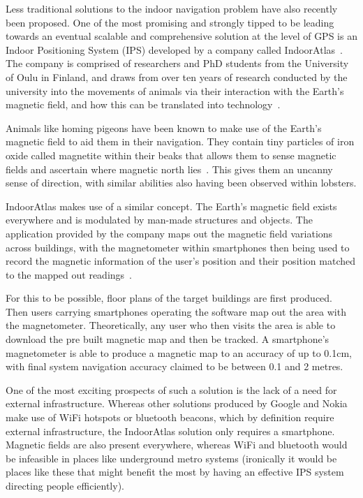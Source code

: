 \documentclass[12pt,a4paper]{report}
\begin{document}
Less traditional solutions to the indoor navigation problem have also recently been proposed. One of the most promising and strongly tipped to be leading towards an eventual scalable and comprehensive solution at the level of GPS is an Indoor Positioning System (IPS) developed by a company called IndoorAtlas~\cite{indoorAtlas}. The company is comprised of researchers and PhD students from the University of Oulu in Finland, and draws from over ten years of research conducted by the university into the movements of animals via their interaction with the Earth's magnetic field, and how this can be translated into technology~\cite{IAReport}.
 
Animals like homing pigeons have been known to make use of the Earth's magnetic field to aid them in their navigation. They contain tiny particles of iron oxide called magnetite within their beaks that allows them to sense magnetic fields and ascertain where magnetic north lies~\cite{pigeon}. This gives them an uncanny sense of direction, with similar abilities also having been observed within lobsters. 
 
IndoorAtlas makes use of a similar concept. The Earth's magnetic field exists everywhere and is modulated by man-made structures and objects. The application provided by the company maps out the magnetic field variations across buildings, with the magnetometer within smartphones then being used to record the magnetic information of the user's position and their position matched to the mapped out readings~\cite{IAReport}.
 
For this to be possible, floor plans of the target buildings are first produced. Then users carrying smartphones operating the software map out the area with the magnetometer. Theoretically, any user who then visits the area is able to download the pre built magnetic map and then be tracked. A smartphone's magnetometer is able to produce a magnetic map to an accuracy of up to 0.1cm, with final system navigation accuracy claimed to be between 0.1 and 2 metres. 
 
One of the most exciting prospects of such a solution is the lack of a need for external infrastructure. Whereas other solutions produced by Google and Nokia make use of WiFi hotspots or bluetooth beacons, which by definition require external infrastructure, the IndoorAtlas solution only requires a smartphone. Magnetic fields are also present everywhere, whereas WiFi and bluetooth would be infeasible in places like underground metro systems (ironically it would be places like these that might benefit the most by having an effective IPS system directing people efficiently).
 
\end{document}
